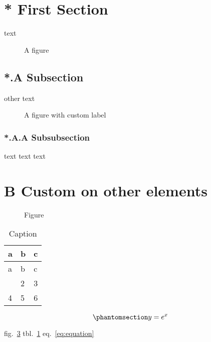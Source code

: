 \section{* First Section}\label{first-section}

text

\begin{figure}
\centering
{}
\caption{A figure}\label{fig:fig1}
\end{figure}

\subsection{*.A Subsection}\label{subsection}

other text

\begin{figure}
\centering
{}
\caption{A figure with custom label}\label{fig:fig2}
\end{figure}

\subsubsection{*.A.A Subsubsection}\label{subsubsection}

text text text

\section{B Custom on other elements}\label{custom-on-other-elements}

\begin{figure}
\centering
{}
\caption{Figure}\label{fig:fig3}
\end{figure}

\begin{longtable}[]{@{}lll@{}}
\caption{\label{tbl:table}Caption}\tabularnewline
\toprule\noalign{}
a & b & c \\
\midrule\noalign{}
\endfirsthead
\toprule\noalign{}
a & b & c \\
\midrule\noalign{}
\endhead
\bottomrule\noalign{}
\endlastfoot
1 & 2 & 3 \\
4 & 5 & 6 \\
\end{longtable}

\begin{equation}\phantomsection\label{eq:equation}{y = e^x}\end{equation}

fig.~\ref{fig:fig3} tbl.~\ref{tbl:table} eq.~\ref{eq:equation}
